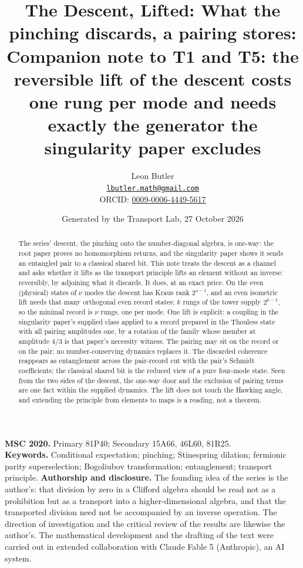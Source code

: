 \documentclass[11pt]{article}
\title{\bfseries The Descent, Lifted: What the pinching discards, a pairing stores: Companion note to T1 and T5: the reversible lift of the descent costs one rung per mode and needs exactly the generator the singularity paper excludes}
\author{Leon Butler\\ \normalsize\href{mailto:lbutler.math@gmail.com}{\texttt{lbutler.math@gmail.com}}\\ \normalsize ORCID: \href{https://orcid.org/0009-0006-4449-5617}{0009-0006-4449-5617}}
\date{Generated by the Transport Lab, 27 October 2026}
\theoremstyle{definition}
\theoremstyle{plain}
\begin{document}
\maketitle
\begin{abstract}
\normalsize
The series' descent, the pinching onto the number-diagonal algebra, is one-way: the root paper proves no homomorphism returns, and the singularity paper shows it sends an entangled pair to a classical shared bit. This note treats the descent as a channel and asks whether it lifts as the transport principle lifts an element without an inverse: reversibly, by adjoining what it discards. It does, at an exact price. On the even (physical) states of $\nu$ modes the descent has Kraus rank $2^{\nu - 1}$, and an even isometric lift needs that many orthogonal even record states; $k$ rungs of the tower supply $2^{k - 1}$, so the minimal record is $\nu$ rungs, one per mode. One lift is explicit: a coupling in the singularity paper's supplied class applied to a record prepared in the Thouless state with all pairing amplitudes one, by a rotation of the family whose member at amplitude $4/3$ is that paper's necessity witness. The pairing may sit on the record or on the pair; no number-conserving dynamics replaces it. The discarded coherence reappears as entanglement across the pair-record cut with the pair's Schmidt coefficients; the classical shared bit is the reduced view of a pure four-mode state. Seen from the two sides of the descent, the one-way door and the exclusion of pairing terms are one fact within the supplied dynamics. The lift does not touch the Hawking angle, and extending the principle from elements to maps is a reading, not a theorem.
\end{abstract}
\medskip
\noindent\textbf{MSC 2020.} Primary 81P40; Secondary 15A66, 46L60, 81R25.\\
\textbf{Keywords.} Conditional expectation; pinching; Stinespring dilation; fermionic parity superselection; Bogoliubov transformation; entanglement; transport principle.
\newpage
\noindent \textbf{Authorship and disclosure. }The founding idea of the series is the author's: that division by zero in a Clifford algebra should be read not as a prohibition but as a transport into a higher-dimensional algebra, and that the transported division need not be accompanied by an inverse operation. The direction of investigation and the critical review of the results are likewise the author's. The mathematical development and the drafting of the text were carried out in extended collaboration with Claude Fable 5 (Anthropic), an AI system.
\end{document}
